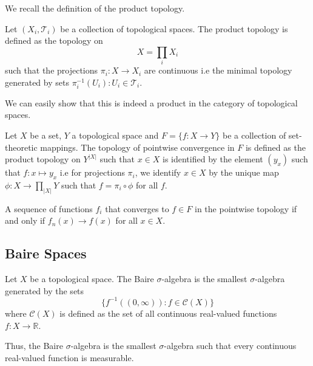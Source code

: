 \documentclass[main.tex]{subfiles}
\begin{document}
We recall the definition of the product topology.

\begin{definition}
Let $(X_i,\mathcal{T}_i)$ be a collection of topological spaces. The product topology is defined as the topology on 
$$ X = \prod_i X_i $$
such that the projections $\pi_i: X \rightarrow X_i$ are continuous i.e the minimal topology generated by sets $\pi_i^{-1}(U_i) : U_i \in \mathcal{T}_i$. 
\end{definition}

We can easily show that this is indeed a product in the category of topological spaces.

\begin{definition}
Let $X$ be a set, $Y$ a topological space and $F = \{f:X \rightarrow Y \}$ be a collection of set-theoretic mappings. The topology of pointwise convergence in $F$ is defined as the product topology on $Y^{|X|}$ such that $x \in X$ is identified by the element $(y_x)$ such that $f: x \mapsto y_x$ i.e for projections $\pi_i$, we identify $x \in X$ by the unique map $\phi: X \rightarrow \prod_{|X|} Y$ such that $f = \pi_i \circ \phi$ for all $f$.
\end{definition}

\begin{proposition}
 A sequence of functions $f_i$ that converges to $f \in F$ in the pointwise topology if and only if $f_n(x) \rightarrow f(x)$ for all $x \in X$.
\end{proposition}


\subsection{Baire Spaces}

\begin{definition}
 Let $X$ be a topological space. The Baire $\sigma$-algebra is the smallest $\sigma$-algebra generated by the sets
 $$ \{ f^{-1}((0,\infty)) : f \in \mathcal{C}(X)\}$$ where $\mathcal{C}(X)$ is defined as the set of all continuous real-valued functions $f:X \rightarrow \mathbb{R}$.
\end{definition}

Thus, the Baire $\sigma$-algebra is the smallest $\sigma$-algebra such that every continuous real-valued function is measurable.
\end{document}
